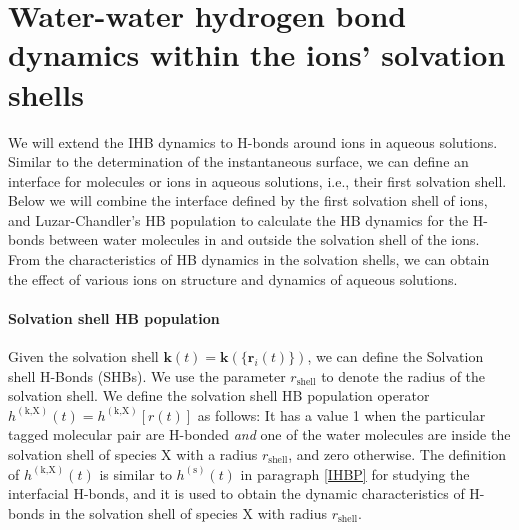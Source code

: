 \FloatBarrier
\section{Water-water hydrogen bond dynamics within the ions' solvation shells} \label{PARA_SHBD}
We will extend the IHB dynamics to H-bonds around ions in aqueous solutions. 
Similar to the determination of the instantaneous surface, we can define an interface for molecules or ions in aqueous solutions, i.e., 
their first solvation shell. 
Below we will combine the interface defined by the first solvation shell of ions, 
and Luzar-Chandler's HB population \cite{AL96} to calculate the HB
dynamics for the H-bonds between water molecules in and outside the solvation shell of the ions.
From the characteristics of HB dynamics in the solvation shells, we can obtain the effect of various ions on structure and dynamics of aqueous solutions. 

\paragraph{Solvation shell HB population}\label{para:SHBP}
Given the solvation shell ${\mathbf k}(t)={\mathbf k}(\{{\mathbf r}_i(t)\})$, we can define the Solvation shell H-Bonds (SHBs).
We use the parameter $r_\text{shell}$ to denote the radius of the solvation shell.
We define the solvation shell HB population operator $h^{(\text{k,X})}(t) = h^{(\text{k,X})}[{r}(t)]$ as follows:
It has a value 1 when the particular tagged molecular pair are H-bonded \emph{and} one of the water molecules are inside the solvation shell of species X
with a radius $r_\text{shell}$, and zero otherwise. 
The definition of $h^{(\text{k,X})}(t)$ is similar to $h^{(\text{s})}(t)$ in paragraph \ref{IHBP} for studying the interfacial H-bonds, and it is used to obtain the dynamic characteristics of H-bonds in the solvation shell of species X with radius $r_\text{shell}$. 

